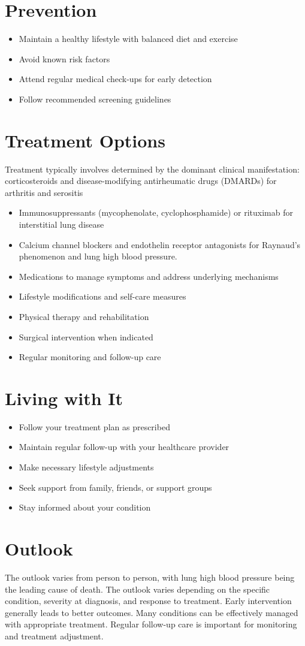 \section{Prevention}
\begin{itemize}[noitemsep]
  \item Maintain a healthy lifestyle with balanced diet and exercise
  \item Avoid known risk factors
  \item Attend regular medical check-ups for early detection
  \item Follow recommended screening guidelines
\end{itemize}
\section{Treatment Options}
Treatment typically involves determined by the dominant clinical manifestation: corticosteroids and disease-modifying antirheumatic drugs (DMARDs) for arthritis and serositis

\begin{itemize}[noitemsep]
  \item Immunosuppressants (mycophenolate, cyclophosphamide) or rituximab for interstitial lung disease
  \item Calcium channel blockers and endothelin receptor antagonists for Raynaud's phenomenon and lung high blood pressure.
  \item Medications to manage symptoms and address underlying mechanisms
  \item Lifestyle modifications and self-care measures
  \item Physical therapy and rehabilitation
  \item Surgical intervention when indicated
  \item Regular monitoring and follow-up care
\end{itemize}
\section{Living with It}
\begin{itemize}[noitemsep]
  \item Follow your treatment plan as prescribed
  \item Maintain regular follow-up with your healthcare provider
  \item Make necessary lifestyle adjustments
  \item Seek support from family, friends, or support groups
  \item Stay informed about your condition
\end{itemize}
\section{Outlook}
The outlook varies from person to person, with lung high blood pressure being the leading cause of death. The outlook varies depending on the specific condition, severity at diagnosis, and response to treatment. Early intervention generally leads to better outcomes. Many conditions can be effectively managed with appropriate treatment. Regular follow-up care is important for monitoring and treatment adjustment.
